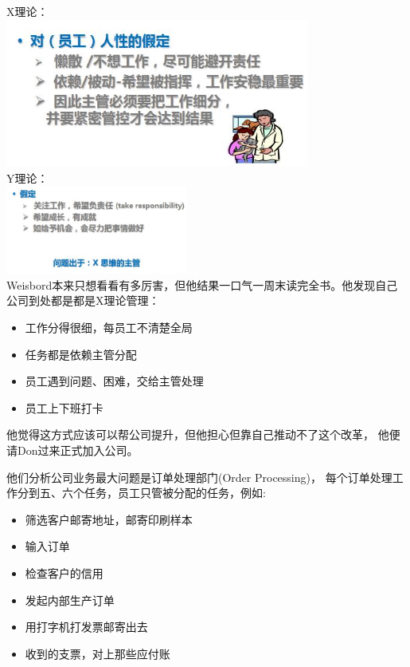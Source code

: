 X理论：\\

\includegraphics[width=10cm]{0A_Agile_stories_p2.jpg}\\

Y理论：\\

\includegraphics[width=6cm]{0A_Agile_stories_p3.jpg}\\
Weisbord本来只想看看有多厉害，但他结果一口气一周末读完全书。他发现自己公司到处都是都是X理论管理：\\

\begin{itemize}
\tightlist
\item
  工作分得很细，每员工不清楚全局
\item
  任务都是依赖主管分配
\item
  员工遇到问题、困难，交给主管处理
\item
  员工上下班打卡
\end{itemize}

他觉得这方式应该可以帮公司提升，但他担心但靠自己推动不了这个改革，
他便请Don过来正式加入公司。

他们分析公司业务最大问题是订单处理部门(Order Processing)，
每个订单处理工作分到五、六个任务，员工只管被分配的任务，例如:

\begin{itemize}
\tightlist
\item
  筛选客户邮寄地址，邮寄印刷样本
\item
  输入订单
\item
  检查客户的信用
\item
  发起内部生产订单
\item
  用打字机打发票邮寄出去
\item
  收到的支票，对上那些应付账
\end{itemize}


